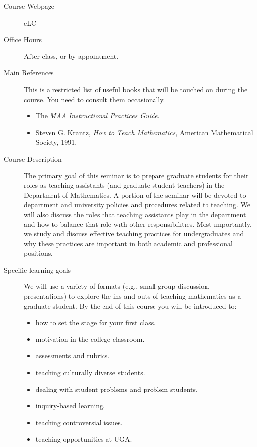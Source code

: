 \documentclass[11pt, a4paper]{article}
\begin{document}
\begin{description}
  
\item[Course Webpage] eLC


\item[Office Hours] After class, or by appointment.

\item[Main References] %
  This is a restricted list of useful books that will be touched on
  during the course. You need to consult them occasionally.
  \begin{itemize}
  \item The {\textit{MAA Instructional Practices Guide}}.
  \item Steven G. Krantz, {\textit{How to Teach Mathematics}}, American Mathematical Society, 1991.
  \end{itemize} 


\item[Course Description] The primary goal of this seminar is to
  prepare graduate students for their roles as teaching assistants
  (and graduate student teachers) in the Department of Mathematics. A
  portion of the seminar will be devoted to department and university
  policies and procedures related to teaching. We will also discuss
  the roles that teaching assistants play in the department and how to
  balance that role with other responsibilities. Most importantly, we
  study and discuss effective teaching practices for undergraduates
  and why these practices are important in both academic and
  professional positions.


\item[Specific learning goals] We will use a variety of formats (e.g.,
  small-group-discussion, presentations) to explore the ins and outs
  of teaching mathematics as a graduate student.  By the end of this
  course you will be introduced to:
  \begin{multicols}{2}
    \begin{itemize}
    \item how to set the stage for your first class.
    \item motivation in the college classroom.
    \item assessments and rubrics.
    \item teaching culturally diverse students.
    \item dealing with student problems and problem students.
    \item inquiry-based learning.
    \item teaching controversial issues.
    \item teaching opportunities at UGA.
    \end{itemize}
  \end{multicols}


\end{description}
\end{document}

